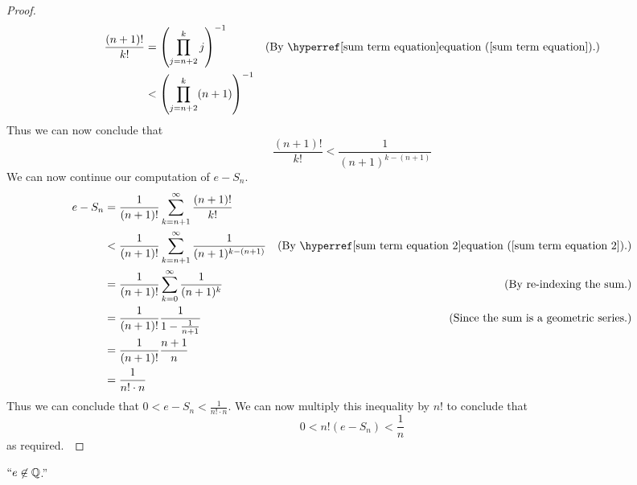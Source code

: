 \begin{proof}
\begin{align*}
                \frac{(n + 1)!}{k!} &= \left(\prod_{j = n + 2}^{k} j \right)^{-1}
                                    & \just{By \equationRef{sum term equation}.}
                                    &< \left(\prod_{j = n + 2}^{k} (n + 1) \right)^{-1}\\
            \end{align*}
            Thus we can now conclude that
            \begin{equation}
                \label{sum term equation 2}
                \frac{(n + 1)!}{k!} < \frac{1}{(n + 1)^{k - (n + 1)}}
            \end{equation}
            We can now continue our computation of $e - S_n$.
            \begin{align*}
                e - S_n &= \frac{1}{(n + 1)!} \sum_{k = n + 1}^{\infty} \frac{(n + 1)!}{k!} \\
                        &< \frac{1}{(n + 1)!} \sum_{k = n + 1}^{\infty} \frac{1}{(n + 1)^{k - (n + 1)}}
                        & \just{By \equationRef{sum term equation 2}.}
                        &= \frac{1}{(n + 1)!} \sum_{k = 0}^{\infty} \frac{1}{(n + 1)^{k}}
                        & \just{By re-indexing the sum.}
                        &= \frac{1}{(n + 1)!} \frac{1}{1 - \frac{1}{n + 1}}
                        & \just{Since the sum is a geometric series.}
                        &= \frac{1}{(n + 1)!} \frac{n + 1}{n} \\
                        &= \frac{1}{n! \cdot n}
            \end{align*}
            Thus we can conclude that $0 < e - S_n < \frac{1}{n! \cdot n}$. We can now multiply
            this inequality by $n!$ to conclude that
            \begin{equation}
                0 < n! (e - S_n) < \frac{1}{n}
            \end{equation}
            as required.~\QED
        \end{proof}
        \begin{theorem}
            $``e \not\in \mathbb{Q}$.''
        \end{theorem}
